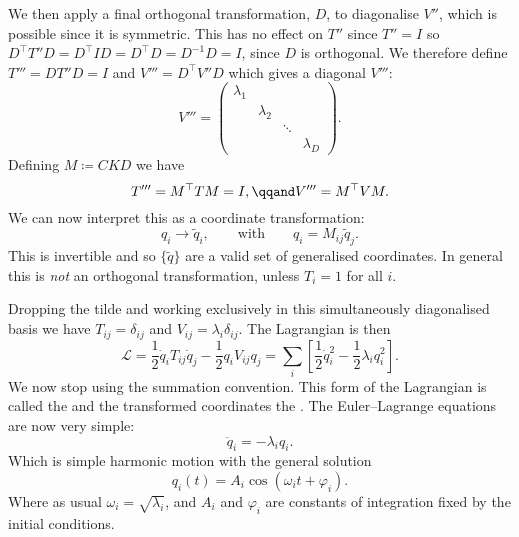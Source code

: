 \documentclass[fleqn]{NotesClass}
\newcommand*{\lagrangian}{\mathcal{L}}
\newcommand*{\ident}{I}
\newcommand*{\trans}{\top}
\begin{document}
    We then apply a final orthogonal transformation, \(D\), to diagonalise \(V''\), which is possible since it is symmetric.
    This has no effect on \(T''\) since \(T'' = \ident\) so \(D^{\trans}T''D = D^{\trans}\ident D = D^{\trans}D = D^{-1}D = \ident\), since \(D\) is orthogonal.
    We therefore define \(T''' = DT''D = \ident\) and \(V''' = D^{\trans}V''D\) which gives a diagonal \(V'''\):
    \begin{equation}
        V''' =
        \begin{pmatrix}
            \lambda_1 &           &        & \\
                      & \lambda_2 &        & \\
                      &           & \ddots & \\
                      &           &        & \lambda_D
        \end{pmatrix}
        .
    \end{equation}
    Defining \(M \coloneqq CKD\) we have
    \begin{equation}
        T''' = M^{\trans}TM = \ident, \qqand V''' = M^{\trans}VM.
    \end{equation}
    We can now interpret this as a coordinate transformation:
    \begin{equation}
        q_i \to \tilde{q}_i, \qquad\text{with}\qquad q_i = M_{ij}\tilde{q}_j.
    \end{equation}
    This is invertible and so \(\{\tilde{q}\}\) are a valid set of generalised coordinates.
    In general this is \emph{not} an orthogonal transformation, unless \(T_i = 1\) for all \(i\).
    
    Dropping the tilde and working exclusively in this simultaneously diagonalised basis we have \(T_{ij} = \delta_{ij}\) and \(V_{ij} = \lambda_i\delta_{ij}\).
    The Lagrangian is then
    \begin{equation}
        \lagrangian = \frac{1}{2}\dot{q}_iT_{ij}\dot{q}_j - \frac{1}{2}q_iV_{ij}q_j = \sum_{i} \left[ \frac{1}{2}\dot{q}_i^2 - \frac{1}{2}\lambda_iq_i^2 \right].
    \end{equation}
    We now stop using the summation convention.
    This form of the Lagrangian is called the  and the transformed coordinates the .
    The Euler--Lagrange equations are now very simple:
    \begin{equation}
        \ddot{q}_i = -\lambda_iq_i.
    \end{equation}
    Which is simple harmonic motion with the general solution
    \begin{equation}
        q_i(t) = A_i\cos(\omega_i t + \varphi_i).
    \end{equation}
    Where as usual \(\omega_i = \sqrt{\lambda_i}\), and \(A_i\) and \(\varphi_i\) are constants of integration fixed by the initial conditions.
    
\end{document}
